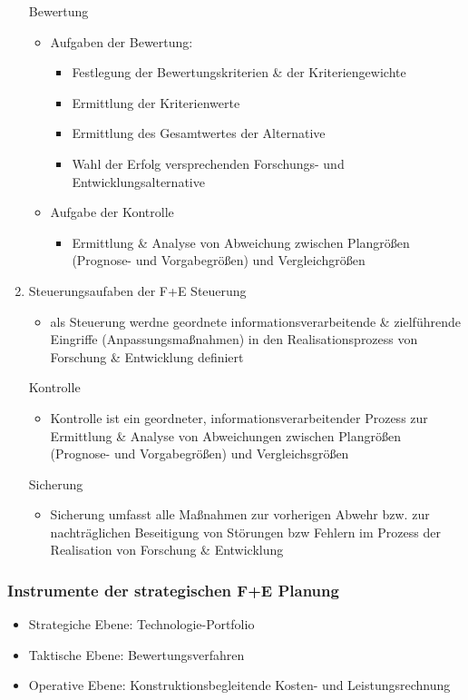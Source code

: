 \documentclass[11pt]{article}
\begin{document}
\begin{enumerate}
Bewertung
\begin{itemize}
\item Aufgaben der Bewertung:
\begin{itemize}
\item Festlegung der Bewertungskriterien \& der Kriteriengewichte
\item Ermittlung der Kriterienwerte
\item Ermittlung des Gesamtwertes der Alternative
\item Wahl der Erfolg versprechenden Forschungs- und Entwicklungsalternative
\end{itemize}
\item Aufgabe der Kontrolle
\begin{itemize}
\item Ermittlung \& Analyse von Abweichung zwischen Plangrößen (Prognose- und Vorgabegrößen) und Vergleichgrößen
\end{itemize}
\end{itemize}

\item Steuerungsaufaben der F+E
\label{sec:orgf715c87}
Steuerung
\begin{itemize}
\item als Steuerung werdne geordnete informationsverarbeitende \& zielführende Eingriffe (Anpassungsmaßnahmen) in den Realisationsprozess von Forschung \& Entwicklung definiert
\end{itemize}

Kontrolle
\begin{itemize}
\item Kontrolle ist ein geordneter, informationsverarbeitender Prozess zur Ermittlung \& Analyse von Abweichungen zwischen Plangrößen (Prognose- und Vorgabegrößen) und Vergleichsgrößen
\end{itemize}

Sicherung
\begin{itemize}
\item Sicherung umfasst alle Maßnahmen zur vorherigen Abwehr bzw. zur nachträglichen Beseitigung von Störungen bzw Fehlern im Prozess der Realisation von Forschung \& Entwicklung
\end{itemize}
\end{enumerate}
\subsubsection{Instrumente der strategischen F+E Planung}
\label{sec:org37fb8f3}
\begin{itemize}
\item Strategiche Ebene: Technologie-Portfolio
\item Taktische Ebene: Bewertungsverfahren
\item Operative Ebene: Konstruktionsbegleitende Kosten- und Leistungsrechnung
\end{itemize}
\end{document}
